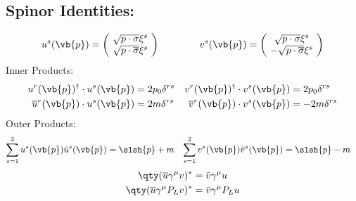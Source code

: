 \subsection{Spinor Identities:}
	\begin{equation*}
		u^s(\vb{p})=
		\begin{pmatrix}
			\ \sqrt{p\cdot\sigma}\xi^{s}\ 
			\\
			\ \sqrt{p\cdot\overline{\sigma}}\xi^{s}\ 
		\end{pmatrix}
		\qquad\qquad
		v^s(\vb{p})=
		\begin{pmatrix}
			\ \sqrt{p\cdot\sigma}\xi^{s}\ 
			\\
			\ -\sqrt{p\cdot\overline{\sigma}}\xi^{s}\ 
		\end{pmatrix}
	\end{equation*}
	Inner Products:
	\begin{align*}
		u^r(\vb{p})^\dagger\cdot u^s(\vb{p})&=2p_0\delta^{rs}
		&
		v^r(\vb{p})^\dagger\cdot v^s(\vb{p})&=2p_0\delta^{rs}
		\\
		\overline{u}^r(\vb{p})\cdot u^s(\vb{p})&=2m\delta^{rs}
		&
		\overline{v}^r(\vb{p})\cdot v^s(\vb{p})&=-2m\delta^{rs}
	\end{align*}
	Outer Products:
	\begin{align*}
		\sum_{s=1}^{2}u^s(\vb{p})\bar{u}^s(\vb{p})&=\slsh{p}+m
		&
		\sum_{s=1}^{2}v^s(\vb{p})\bar{v}^s(\vb{p})&=\slsh{p}-m
	\end{align*}
	\begin{align*}
		\qty(\overline{u}\gamma^\mu v)^*&=\bar{v}\gamma^\mu u 
		\\
		\qty(\overline{u}\gamma^\mu P_Lv)^*&=\bar{v}\gamma^\mu P_L u
	\end{align*}
\newpage
